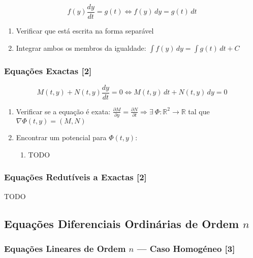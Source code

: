 \documentclass[11pt, a4paper]{article}
\begin{document}
\begin{equation*}
    f(y)\frac{dy}{dt} = g(t) \Leftrightarrow
    f(y) \, dy = g(t) \, dt
\end{equation*}

\begin{enumerate}
    \item Verificar que está escrita na forma separável
    \item Integrar ambos os membros da igualdade:
          $\displaystyle \int f(y) \, dy = \int g(t) \, dt + C$
\end{enumerate}

\subsubsection{Equações Exactas [2]}

\begin{equation*}
    M(t,y) + N(t, y)\frac{dy}{dt} = 0 \Leftrightarrow
    M(t,y) \, dt + N(t, y) \, dy = 0
\end{equation*}

\begin{enumerate}
    \item Verificar se a equação é exata:
          $\displaystyle \frac{\partial M}{\partial y} =
              \frac{\partial N}{\partial t} \Rightarrow
              \exists\ \Phi: \mathbb{R}^2 \rightarrow \mathbb{R}$ tal que
          $\nabla \Phi(t, y) = (M, N)$
    \item Encontrar um potencial para $\Phi(t, y)$:
          \begin{enumerate}
              \item TODO
          \end{enumerate}
\end{enumerate}

\subsubsection{Equações Redutíveis a Exactas [2]}

TODO

\subsection{Equações Diferenciais Ordinárias de Ordem $n$}

\subsubsection{Equações Lineares de Ordem $n$ — Caso Homogéneo [3]}
\end{document}
